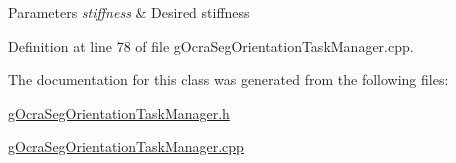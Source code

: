 \begin{DoxyParams}{Parameters}
{\em stiffness} & Desired stiffness \\
\hline
\end{DoxyParams}


Definition at line 78 of file g\+Ocra\+Seg\+Orientation\+Task\+Manager.\+cpp.



The documentation for this class was generated from the following files\+:\begin{DoxyCompactItemize}
\item 
\hyperlink{gOcraSegOrientationTaskManager_8h}{g\+Ocra\+Seg\+Orientation\+Task\+Manager.\+h}\item 
\hyperlink{gOcraSegOrientationTaskManager_8cpp}{g\+Ocra\+Seg\+Orientation\+Task\+Manager.\+cpp}\end{DoxyCompactItemize}
